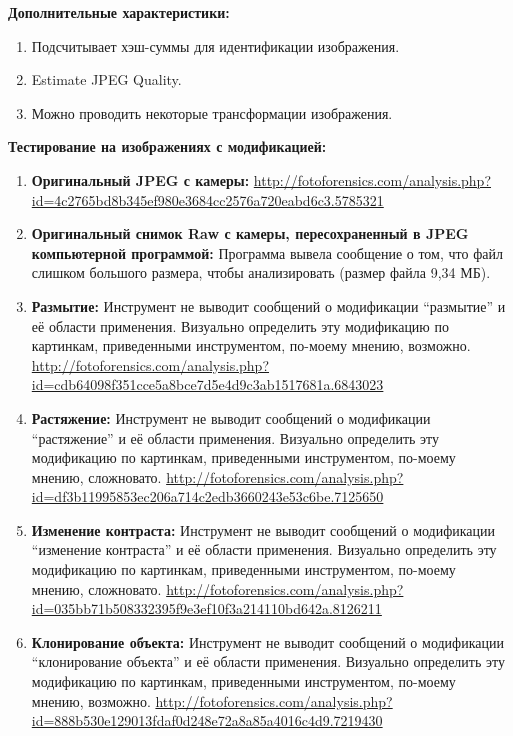 \textbf{Дополнительные характеристики:}
\begin{enumerate}
  \item Подсчитывает хэш-суммы для идентификации изображения.
  \item Estimate JPEG Quality.
  \item Можно проводить некоторые трансформации изображения.
\end{enumerate}

\textbf{Тестирование на изображениях с модификацией:}
\begin{enumerate}
\item \textbf{Оригинальный JPEG с камеры:}
\url{http://fotoforensics.com/analysis.php?id=4c2765bd8b345ef980e3684cc2576a720eabd6c3.5785321}

\item \textbf{Оригинальный снимок Raw с камеры, пересохраненный в JPEG компьютерной программой:}
Программа вывела сообщение о том, что файл слишком большого размера, чтобы анализировать (размер файла 9,34 МБ).

\item \textbf{Размытие:}
Инструмент не выводит сообщений о модификации “размытие” и её области применения. Визуально определить эту модификацию по картинкам, приведенными инструментом, по-моему мнению, возможно.
\url{http://fotoforensics.com/analysis.php?id=cdb64098f351cce5a8bce7d5e4d9c3ab1517681a.6843023}

\item \textbf{Растяжение:}
Инструмент не выводит сообщений о модификации “растяжение” и её области применения. Визуально определить эту модификацию по картинкам, приведенными инструментом, по-моему мнению, сложновато.
\url{http://fotoforensics.com/analysis.php?id=df3b11995853ec206a714c2edb3660243e53c6be.7125650}

\item \textbf{Изменение контраста:}
Инструмент не выводит сообщений о модификации “изменение контраста” и её области применения. Визуально определить эту модификацию по картинкам, приведенными инструментом, по-моему мнению, сложновато.
\url{http://fotoforensics.com/analysis.php?id=035bb71b508332395f9e3ef10f3a214110bd642a.8126211}

\item \textbf{Клонирование объекта:}
Инструмент не выводит сообщений о модификации “клонирование объекта” и её области применения. Визуально определить эту модификацию по картинкам, приведенными инструментом, по-моему мнению, возможно.
\url{http://fotoforensics.com/analysis.php?id=888b530e129013fdaf0d248e72a8a85a4016c4d9.7219430}


\end{enumerate}
